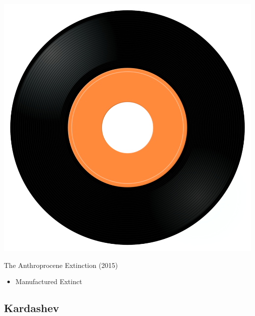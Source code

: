 \begin{minipage}[t]{0.25\textwidth}\vspace{0pt}
\captionsetup{type=figure}
\includegraphics[width=\textwidth]{Images/cover.png}
\caption*{The Anthroprocene Extinction (2015)}
\end{minipage}
\begin{minipage}[t]{0.25\textwidth}\vspace{0pt}
\begin{itemize}[nosep,leftmargin=1em,labelwidth=*,align=left]
	\setlength{\itemsep}{0pt}
	\item Manufactured Extinct
\end{itemize}
\end{minipage}

\subsection{Kardashev}

